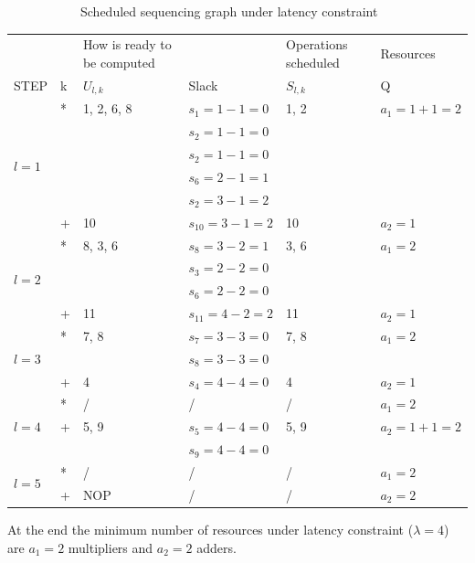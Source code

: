\begin{figure}[H]
\begin{subfigure}[b]{0.4\textwidth}
        \caption{Scheduled sequencing graph under latency constraint}
   		\label{fig:ListLabelSchLaten}
    \end{subfigure}
    \caption{}
\end{figure}
\begin{center}
\begin{tabular}{l|l|l|l|l|l}
  \multicolumn{1}{l}{} & \multicolumn{1}{l}{} & \multicolumn{1}{l}{How is ready to be computed} &  \multicolumn{1}{l}{} & \multicolumn{1}{l}{Operations scheduled} & \multicolumn{1}{l}{Resources} \\
  STEP & k & $ U_{l,k} $ & Slack & $ S_{l,k} $ & Q \\
  \hline
  \multirow{6}{*}{$ l=1 $} 
  & * & 1, 2, 6, 8 & $ s_1=1-1=0 $ & 1, 2 & $ a_1=1+1=2 $ \\
  & & & $ s_2=1-1=0 $ & & \\
  & & & $ s_2=1-1=0 $ & & \\
  & & & $ s_6=2-1=1 $ & & \\
  & & & $ s_2=3-1=2 $ & & \\
  & + & 10 & $ s_{10}=3-1=2 $ & 10 & $ a_2=1 $ \\
  \hline
  \multirow{4}{*}{$ l=2 $} 
  & * & 8, 3, 6 & $ s_8=3-2=1 $ & 3, 6 & $ a_1=2 $ \\
  & & & $ s_3=2-2=0 $ & & \\
  & & & $ s_6=2-2=0 $ & & \\
  & + & 11 & $ s_{11}=4-2=2 $ & 11 & $ a_2=1 $ \\
  \hline
  \multirow{3}{*}{$ l=3 $} 
  & * & 7, 8 & $ s_7=3-3=0 $ & 7, 8 & $ a_1=2 $ \\
  & & & $ s_8=3-3=0 $ & & \\
  & + & 4 & $ s_4=4-4=0 $ & 4 & $ a_2=1 $ \\
  \hline
  \multirow{3}{*}{$ l=4 $} 
  & * & / & / & / & $ a_1=2 $ \\
  & + & 5, 9 & $ s_5=4-4=0 $ & 5, 9 & $ a_2=1+1=2 $ \\
  & & & $ s_9=4-4=0 $ & & \\
  \hline
  \multirow{2}{*}{$ l=5 $} 
  & * & / & / & / & $ a_1=2 $ \\
  & + & NOP & / & / & $ a_2=2 $ \\
\end{tabular}
\end{center}
At the end the minimum number of resources under latency constraint ($\lambda = 4$) are $ a_1 = 2 $ multipliers and $ a_2 = 2 $ adders.